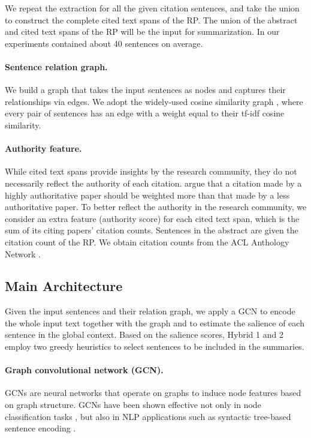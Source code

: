 \documentclass[letterpaper]{article} \usepackage{aaai19}  \usepackage{times}  \usepackage{helvet}  \usepackage{courier}  \usepackage{url}
\begin{document}
We repeat the extraction for all the given citation sentences, and take the union to construct the complete cited text spans of the RP.
The union of the abstract and cited text spans of the RP will be the input  for summarization.
In our experiments  contained about 40 sentences on average.


\paragraph{Sentence relation graph.}

We build a graph
that takes the input sentences as nodes and captures their relationships via edges.
We adopt the widely-used
cosine similarity graph \cite{erkan2004lexrank}, where
every pair of sentences has an edge with a weight equal to their tf-idf cosine similarity.



\paragraph{Authority feature.}

While cited text spans provide insights by the research community, they do not necessarily reflect the authority of each citation.
\citet{mei-zhai:2008:ACLMain} argue that a citation made by a highly authoritative paper should be weighted more than that made by a less authoritative paper.
To better reflect the authority in the research community,
we consider an extra feature (authority score) for each cited text span, which is the sum of its citing papers' citation counts.
Sentences in the abstract are given the citation count of the RP.
We obtain
citation counts from the ACL Anthology Network \cite{aan_2013}.




\subsection{Main Architecture}

Given the input sentences and their relation graph,
we apply a GCN \cite{kipf2017semi}
to encode the whole input text together with the graph and to estimate the salience of each sentence in the global context.
Based on the salience scores, Hybrid 1 and 2 employ two greedy heuristics to select sentences to be included in the summaries.


\paragraph{Graph convolutional network (GCN).}
GCNs are neural networks that operate on graphs
to induce node features
based on graph structure.
GCNs have been shown effective not only in node classification tasks \cite{kipf2017semi}, but also in NLP applications such as
syntactic tree-based
sentence encoding \cite{marcheggiani2017encoding}.
\end{document}
